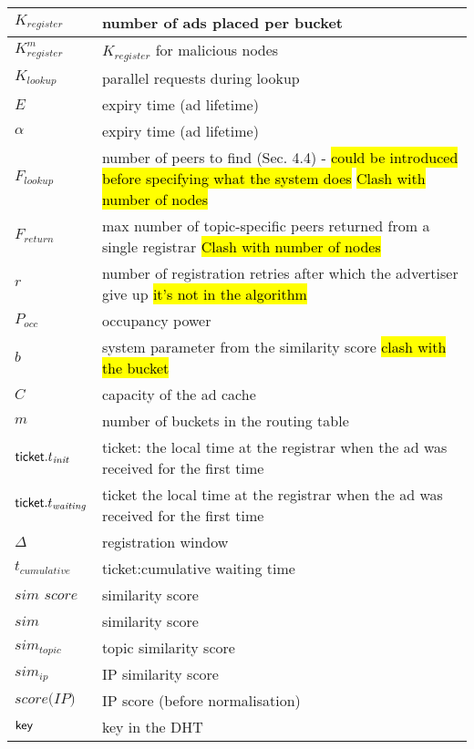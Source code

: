 \begin{table*}
\begin{center}
\begin{tabular}{ | l | p{16cm} |}
      $K_{\textit{register}}$ & number of ads placed per bucket\\ \hline
      $K^m_{\textit{register}}$ & $K_{\textit{register}}$ for malicious nodes \\ \hline
      $K_{\textit{lookup}}$ & parallel requests during lookup\\ \hline
      $E$ & expiry time (ad lifetime) \\ \hline
      $\alpha$ & expiry time (ad lifetime) \\ \hline
      $F_{\textit{lookup}}$ & number of peers to find (Sec. 4.4) - \hl{could be introduced before specifying what the system does}  \hl{Clash with number of nodes} \\ \hline
      $F_{\textit{return}}$ & max number of topic-specific peers returned from a single registrar \hl{Clash with number of nodes} \\ \hline
      $r$ & number of registration retries after which the advertiser give up \hl{it's not in the algorithm} \\ \hline
      $P_\textit{occ}$ & occupancy power \\ \hline
      $b$ & system parameter from the similarity score \hl{clash with the bucket} \\ \hline
      $C$ & capacity of the ad cache \\ \hline
      $m$ & number of buckets in the routing table \\ \hline

      $\mathsf{ticket}.t_{\textit{init}}$ & ticket: the local time at the registrar when the ad was received for the first time \\ \hline
        $\mathsf{ticket}.t_{\textit{waiting}}$ & ticket the local time at the registrar when the ad was received for the first time \\ \hline
        $\Delta$ & registration window\\ \hline
        $t_{\textit{cumulative}}$ & ticket:cumulative waiting time \\ \hline

      $\textit{sim score}$ & similarity score \\ \hline
      $\textit{sim}$ & similarity score \\ \hline
      $\textit{sim}_\textit{topic}$ & topic similarity score \\ \hline
      $\textit{sim}_{ip}$ & IP similarity score \\ \hline
      $\textit{score(IP)}$ & IP score (before normalisation) \\ \hline


      $\mathsf{key}$ & key in the DHT \\ \hline
    \hline
  \end{tabular}
\end{center}
\end{table*}

